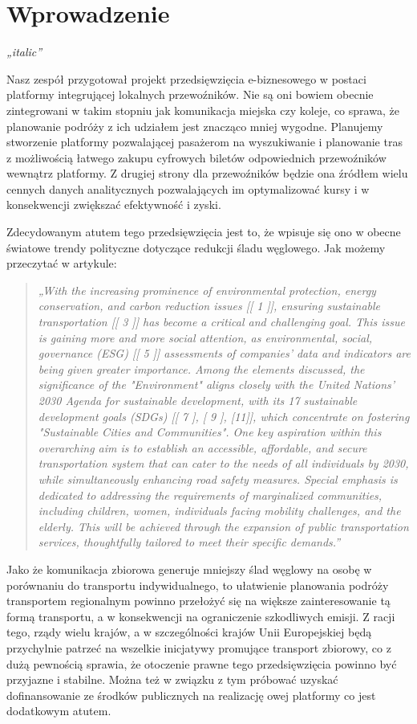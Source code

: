 \chapter{Wprowadzenie}
\label{chap:pierwszy}

\textit{„italic”}

Nasz zespół przygotował projekt przedsięwzięcia e-biznesowego w postaci platformy integrującej lokalnych przewoźników. Nie są oni bowiem obecnie zintegrowani w takim stopniu jak komunikacja miejska czy koleje, co sprawa, że planowanie podróży z ich udziałem jest znacząco mniej wygodne. Planujemy stworzenie platformy pozwalającej pasażerom na wyszukiwanie i planowanie tras z możliwością łatwego zakupu cyfrowych biletów odpowiednich przewoźników wewnątrz platformy. Z drugiej strony dla przewoźników będzie ona źródłem wielu cennych danych analitycznych pozwalających im optymalizować kursy i w konsekwencji zwiększać efektywność i zyski.

Zdecydowanym atutem tego przedsięwzięcia jest to, że wpisuje się ono w obecne światowe trendy polityczne dotyczące redukcji śladu węglowego. Jak możemy przeczytać w artykule:
\begin{quote}\textit{„With the increasing prominence of environmental protection, energy conservation, and carbon reduction issues [[ 1 ]], ensuring sustainable transportation [[ 3 ]] has become a critical and challenging goal. This issue is gaining more and more social attention, as environmental, social, governance (ESG) [[ 5 ]] assessments of companies' data and indicators are being given greater importance. Among the elements discussed, the significance of the "Environment" aligns closely with the United Nations' 2030 Agenda for sustainable development, with its 17 sustainable development goals (SDGs) [[ 7 ], [ 9 ], [11]], which concentrate on fostering "Sustainable Cities and Communities". One key aspiration within this overarching aim is to establish an accessible, affordable, and secure transportation system that can cater to the needs of all individuals by 2030, while simultaneously enhancing road safety measures. Special emphasis is dedicated to addressing the requirements of marginalized communities, including children, women, individuals facing mobility challenges, and the elderly. This will be achieved through the expansion of public transportation services, thoughtfully tailored to meet their specific demands.”} \citep{advancingESG} \end{quote}
Jako że komunikacja zbiorowa generuje mniejszy ślad węglowy na osobę w porównaniu do transportu indywidualnego, to ułatwienie planowania podróży transportem regionalnym powinno przełożyć się na większe zainteresowanie tą formą transportu, a w konsekwencji na ograniczenie szkodliwych emisji. Z racji tego, rządy wielu krajów, a w szczególności krajów Unii Europejskiej będą przychylnie patrzeć na wszelkie inicjatywy promujące transport zbiorowy, co z dużą pewnością sprawia, że otoczenie prawne tego przedsięwzięcia powinno być przyjazne i stabilne. Można też w związku z tym próbować uzyskać dofinansowanie ze środków publicznych na realizację owej platformy co jest dodatkowym atutem.

